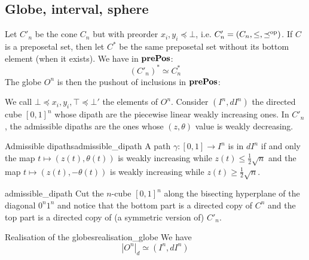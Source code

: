 \subsection{Globe, interval, sphere}
Let \( C'_n \) be the cone \( C_n \) but with preorder \( x_i, y_i \preceq \bot \), i.e. \( C'_n = (C_n, \le, \preceq^{\operatorname{op}}) \). If \( C \) is a preposetal set, then let \( C^* \) be the same preposetal set without its bottom element (when it exists). We have in \( \mathbf{prePos} \):
\begin{equation*}
    (C'_n)^* \simeq C_n^*
\end{equation*}
The globe \( O^n \) is then the pushout of inclusions in \( \mathbf{prePos} \):
\begin{center}
\end{center}
We call \( \bot \preceq x_i, y_i, \top \preceq \bot' \) the elements of \( O^n \). Consider \( (I^n, dI^n) \) the directed cube \( [0, 1]^n \) whose dipath are the piecewise linear weakly increasing ones. In \( C'_n \), the admissible dipaths are the ones whose \( (z, \theta) \) value is weakly decreasing.

\begin{clem}{Admissible dipaths}{admissible_dipath}
    A path \( \gamma : [0, 1] \to I^n \) is in \( dI^n \) if and only the map \( t \mapsto (z(t), \theta(t)) \) is weakly increasing while \( z(t) \le \frac12\sqrt{n} \) and the map \( t \mapsto (z(t), -\theta(t)) \) is weakly increasing while \( z(t) \ge \frac12\sqrt{n} \).
\end{clem}
\begin{lemproof}{admissible_dipath}
    Cut the \( n \)-cube \( [0, 1]^n \) along the bisecting hyperplane of the diagonal \( 0^n1^n \) and notice that the bottom part is a directed copy of \( C^n \) and the top part is a directed copy of (a symmetric version of) \( C'_n \). 
\end{lemproof}
\begin{ccor}{Realisation of the globes}{realisation_globe}
    We have
    \begin{equation*}
        |O^n|_d \simeq (I^n, dI^n)
    \end{equation*}
\end{ccor}

